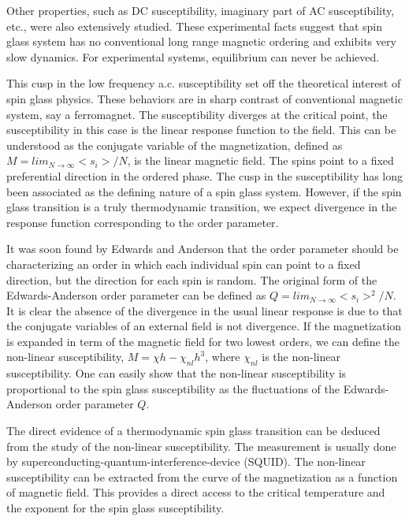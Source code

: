 Other properties, such as DC susceptibility\citep{PhysRevB.19.1633,doi:10.1143/JPSJ.62.4488}, 
imaginary part of AC susceptibility\citep{PhysRevB.25.515,:/content/aip/journal/jap/53/3/10.1063/1.330780}, etc.,
were also extensively studied. 
These experimental facts suggest that spin glass system has no conventional 
long range magnetic ordering and exhibits very slow dynamics. For experimental 
systems, equilibrium can never be achieved. 


This cusp in the low frequency a.c. susceptibility set off the theoretical interest of spin glass physics. 
These behaviors are in sharp contrast of conventional magnetic system, say a ferromagnet. 
The susceptibility diverges at the critical point, the susceptibility
in this case is the linear response function to the field. This can be understood as the conjugate
variable of the magnetization, defined as $M=lim_{N \rightarrow \infty} <s_{i}> / N$, is the linear magnetic field. 
The spins point to a fixed preferential direction in the ordered phase. The cusp in the susceptibility has long been associated as the defining nature of a spin glass system. However, if the spin glass transition is a truly thermodynamic transition, we expect divergence in the response function corresponding to the order parameter. 

It was soon found by Edwards and Anderson that the order parameter should be characterizing an order in which each individual spin can point to a fixed direction, but the direction for each spin is random. The original form of the Edwards-Anderson 
order parameter can be defined as $Q=lim_{N \rightarrow \infty} <s_{i}>^{2} / N$. It is clear the absence 
of the divergence in the usual linear response is due to that the conjugate variables of an external field is not
divergence. If the magnetization is expanded in term of the magnetic field for two lowest orders, we can define
the non-linear susceptibility, $M=\chi h - \chi_{nl} h^{3}$, where $\chi_{nl}$ is the non-linear susceptibility. 
One can easily show that the non-linear susceptibility is proportional to the spin glass susceptibility as 
the fluctuations of the Edwards-Anderson order parameter $Q$. 

The direct evidence of a thermodynamic spin glass transition can be deduced from the study of the non-linear
susceptibility. The measurement is usually done by superconducting-quantum-interference-device (SQUID). The 
non-linear susceptibility can be extracted from the curve of the magnetization as a function of magnetic field.
This provides a direct access to the critical temperature and the exponent for the spin glass susceptibility. 

